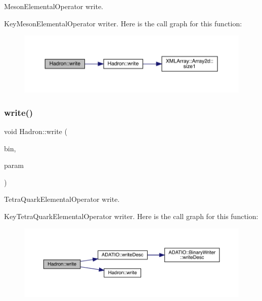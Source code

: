 Meson\+Elemental\+Operator write. 

Key\+Meson\+Elemental\+Operator writer. Here is the call graph for this function\+:
\nopagebreak
\begin{figure}[H]
\begin{center}
\leavevmode
\includegraphics[width=350pt]{d1/daf/namespaceHadron_abb7bfe7ab47ecc24ac8d489bdaf701d2_cgraph}
\end{center}
\end{figure}
\mbox{\label{namespaceHadron_a4fefcfe0419c7e64ff031011643eb810}} 
\subsubsection{\texorpdfstring{write()}{write()}\hspace{0.1cm}{\footnotesize\ttfamily [41/95]}}
{\footnotesize\ttfamily void Hadron\+::write (\begin{DoxyParamCaption}\item[{\mbox{\hyperlink{classADATIO_1_1BinaryWriter}{Binary\+Writer}} \&}]{bin,  }\item[{const \mbox{\hyperlink{structHadron_1_1KeyTetraQuarkElementalOperator__t}{Key\+Tetra\+Quark\+Elemental\+Operator\+\_\+t}} \&}]{param }\end{DoxyParamCaption})}



Tetra\+Quark\+Elemental\+Operator write. 

Key\+Tetra\+Quark\+Elemental\+Operator writer. Here is the call graph for this function\+:
\nopagebreak
\begin{figure}[H]
\begin{center}
\leavevmode
\includegraphics[width=350pt]{d1/daf/namespaceHadron_a4fefcfe0419c7e64ff031011643eb810_cgraph}
\end{center}
\end{figure}
\mbox{\label{namespaceHadron_add6d43a3a15c934d9c3e98989588d22e}} 
